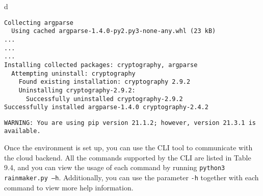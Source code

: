 \documentclass[a4paper,12pt]{book}
\begin{document}
\begin{codebloc}
\begin{tabular}{d}
\vspace{2pt}
\begin{verbatim}
Collecting argparse
  Using cached argparse-1.4.0-py2.py3-none-any.whl (23 kB)
...
...
...
Installing collected packages: cryptography, argparse
  Attempting uninstall: cryptography
    Found existing installation: cryptography 2.9.2
    Uninstalling cryptography-2.9.2:
      Successfully uninstalled cryptography-2.9.2
Successfully installed argparse-1.4.0 cryptography-2.4.2
\end{verbatim}
\verb|WARNING: You are using pip version 21.1.2; however, version 21.3.1 is available.|
\end{tabular}
\end{codebloc}

Once the environment is set up, you can use the CLI tool to communicate with the cloud backend. All the commands supported by the CLI are listed in Table 9.4, and you can view the usage of each command by running \verb|python3 rainmaker.py –h|. Additionally, you can use the parameter \verb|-h| together with each command to view more help information.
\end{document}
